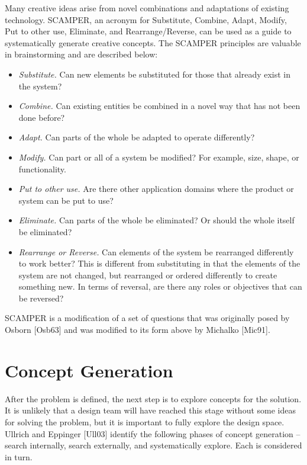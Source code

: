 Many creative ideas arise from novel combinations and adaptations of
existing technology. SCAMPER, an acronym for Substitute, Combine, Adapt,
Modify, Put to other use, Eliminate, and Rearrange/Reverse, can be used
as a guide to systematically generate creative concepts. The SCAMPER
principles are valuable in brainstorming and are described below:

\begin{itemize}
\item
  \emph{Substitute.} Can new elements be substituted for those that
  already exist in the system?
\item
  \emph{Combine.} Can existing entities be combined in a novel way that
  has not been done be­fore?
\item
  \emph{Adapt.} Can parts of the whole be adapted to operate
  differently?
\item
  \emph{Modify.} Can part or all of a system be modified? For example,
  size, shape, or functional­ity.
\item
  \emph{Put to other use.} Are there other application domains where the
  product or system can be put to use?
\item
  \emph{Eliminate.} Can parts of the whole be eliminated? Or should the
  whole itself be elimi­nated?
\item
  \emph{Rearrange or Reverse.} Can elements of the system be rearranged
  differently to work bet­ter? This is different from substituting in
  that the elements of the system are not changed, but rearranged or
  ordered differently to create something new. In terms of reversal, are
  there any roles or objectives that can be reversed?
\end{itemize}

SCAMPER is a modification of a set of questions that was originally
posed by Osborn {[}Osb63{]} and was modified to its form above by
Michalko {[}Mic91{]}.

\section{Concept Generation}
\label{section:concept-generation}

After the problem is defined, the next step is to explore concepts for
the solution. It is unlikely that a design team will have reached this
stage without some ideas for solving the problem, but it is important to
fully explore the design space. Ullrich and Eppinger {[}Ull03{]}
identify the following phases of concept generation -- search
internally, search externally, and systematically explore. Each is
considered in turn.

